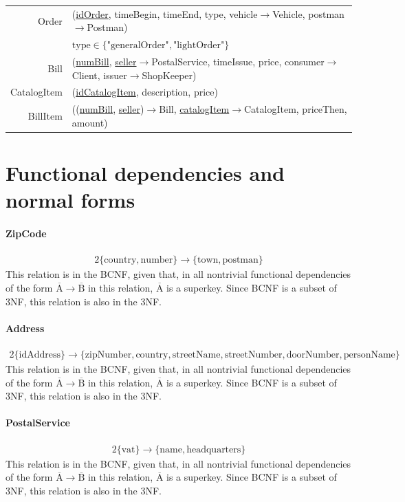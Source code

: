 \documentclass{report}[a4paper]
\theoremstyle{remark}
\begin{document}
\begin{center}
\begin{tabular}{r p{144mm}}
        Order           & (\uline{idOrder}, timeBegin, timeEnd, type, vehicle$\rightarrow$Vehicle, postman$\rightarrow$Postman) \\
                        & $\text{type} \in \{\text{"generalOrder"}, \text{"lightOrder"}\}$\\
        Bill            & (\uline{numBill}, \uline{seller}$\rightarrow$PostalService, timeIssue, price, consumer$\rightarrow$Client, issuer$\rightarrow$ShopKeeper)                                   \\
        CatalogItem     & (\uline{idCatalogItem}, description, price)                           \\
        BillItem        & ((\uline{numBill}, \uline{seller})$\rightarrow$Bill, \uline{catalogItem}$\rightarrow$CatalogItem, priceThen, amount)
    \end{tabular}
\end{center}
\chapter{Functional dependencies and normal forms}
\subsubsection{ZipCode}
\begin{alignat*}{2}
\{\text{country},\text{number}\} \rightarrow \{\text{town}, \text{postman}\}
\end{alignat*}
This relation is in the BCNF, given that, in all nontrivial functional dependencies of the form $\overline{\text{A}} \rightarrow \overline{\text{B}}$ in this relation, $\overline{\text{A}}$ is a superkey. Since BCNF is a subset of 3NF, this relation is also in the 3NF.
\subsubsection{Address}
\begin{alignat*}{2}
\{\text{idAddress}\} \rightarrow \{\text{zipNumber}, \text{country}, \text{streetName}, \text{streetNumber}, \text{doorNumber}, \text{personName}\}
\end{alignat*}
This relation is in the BCNF, given that, in all nontrivial functional dependencies of the form $\overline{\text{A}} \rightarrow \overline{\text{B}}$ in this relation, $\overline{\text{A}}$ is a superkey. Since BCNF is a subset of 3NF, this relation is also in the 3NF.
\subsubsection{PostalService}
\begin{alignat*}{2}
\{\text{vat}\} \rightarrow \{\text{name},\text{headquarters}\}
\end{alignat*}
This relation is in the BCNF, given that, in all nontrivial functional dependencies of the form $\overline{\text{A}} \rightarrow \overline{\text{B}}$ in this relation, $\overline{\text{A}}$ is a superkey. Since BCNF is a subset of 3NF, this relation is also in the 3NF.
\end{document}
